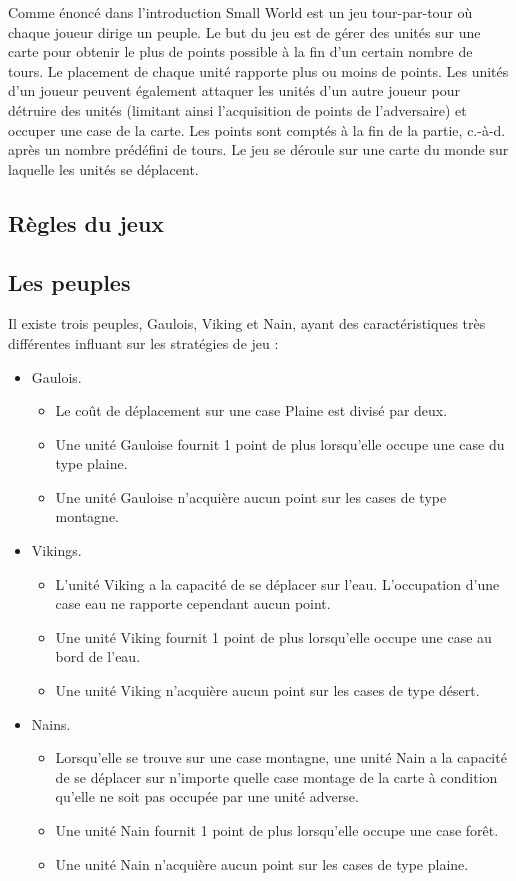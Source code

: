 \documentclass[a4paper]{article}%
\begin{document}
Comme énoncé dans l'introduction Small World est un jeu tour-par-tour où chaque joueur dirige un peuple. Le but du jeu est de gérer des unités sur une carte pour obtenir le plus de points possible à la fin d’un certain nombre de tours. Le placement de chaque unité rapporte plus ou moins de points. Les unités d’un joueur peuvent également attaquer les unités d’un autre joueur pour détruire des unités (limitant ainsi l’acquisition de points de l’adversaire) et occuper une case de la carte. Les points sont comptés à la fin de la partie, c.-à-d. après un nombre prédéfini de tours. Le jeu se déroule sur une carte du monde sur laquelle les unités se déplacent.

\subsection{Règles du jeux}
\subsection{Les peuples}
Il existe trois peuples, Gaulois, Viking et Nain, ayant des caractéristiques très différentes influant sur les stratégies de jeu :

\begin{itemize}

\item Gaulois. \begin{itemize}
\item Le coût de déplacement sur une case Plaine est divisé par deux.
\item Une unité Gauloise fournit 1 point de plus lorsqu’elle occupe une case du type plaine.
\item Une unité Gauloise n’acquière aucun point sur les cases de type montagne.
\end{itemize}
\item Vikings. \begin{itemize}
\item L’unité Viking a la capacité de se déplacer sur l’eau. L’occupation d’une case eau ne rapporte cependant aucun point.
\item Une unité Viking fournit 1 point de plus lorsqu’elle occupe une case au bord de l’eau.
\item Une unité Viking n’acquière aucun point sur les cases de type désert.
\end{itemize}
\item Nains. \begin{itemize}
\item Lorsqu’elle se trouve sur une case montagne, une unité Nain a la capacité de se déplacer sur n’importe quelle case montage de la carte à condition qu’elle ne soit pas occupée par une unité adverse.
\item Une unité Nain fournit 1 point de plus lorsqu’elle occupe une case forêt.
\item Une unité Nain n’acquière aucun point sur les cases de type plaine.
\end{itemize}
\end{itemize}
\end{document}
